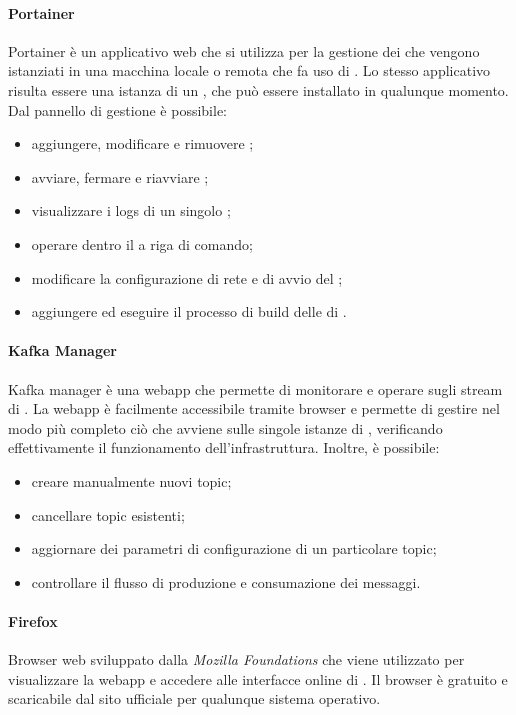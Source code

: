 				\paragraph{Portainer}
					Portainer è un applicativo web che si utilizza per la gestione dei  che vengono istanziati in una macchina locale o remota che fa uso di . Lo stesso applicativo risulta essere una istanza di un , che può essere installato in qualunque momento. Dal pannello di gestione è possibile:
					\begin{itemize}
						\item aggiungere, modificare e rimuovere ;
						\item avviare, fermare e riavviare ;
						\item visualizzare i logs di un singolo ;
						\item operare dentro il  a riga di comando;
						\item modificare la configurazione di rete e di avvio del ;
						\item aggiungere ed eseguire il processo di build delle  di . 
					\end{itemize}

				\paragraph{Kafka Manager}
					Kafka manager è una webapp che permette di monitorare e operare sugli stream di . La webapp è facilmente accessibile tramite browser e permette di gestire nel modo più completo ciò che avviene sulle singole istanze di , verificando effettivamente il funzionamento dell'infrastruttura. Inoltre, è possibile:
					\begin{itemize}
					 	\item creare manualmente nuovi topic;
					 	\item cancellare topic esistenti;
					 	\item aggiornare dei parametri di configurazione di un particolare topic;
					 	\item controllare il flusso di produzione e consumazione dei messaggi.
					 \end{itemize} 

				\paragraph{Firefox} 
					Browser web sviluppato dalla \textit{Mozilla Foundations} che viene utilizzato per visualizzare la webapp e accedere alle interfacce online di . Il browser è gratuito e scaricabile dal sito ufficiale per qualunque sistema operativo.

